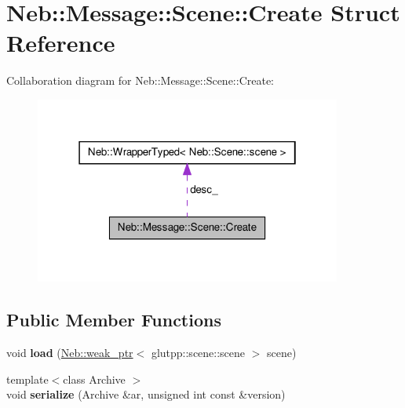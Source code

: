 \hypertarget{structNeb_1_1Message_1_1Scene_1_1Create}{\section{\-Neb\-:\-:\-Message\-:\-:\-Scene\-:\-:\-Create \-Struct \-Reference}
\label{structNeb_1_1Message_1_1Scene_1_1Create}
}


\-Collaboration diagram for \-Neb\-:\-:\-Message\-:\-:\-Scene\-:\-:\-Create\-:\nopagebreak
\begin{figure}[H]
\begin{center}
\leavevmode
\includegraphics[width=286pt]{structNeb_1_1Message_1_1Scene_1_1Create__coll__graph}
\end{center}
\end{figure}
\subsection*{\-Public \-Member \-Functions}
\begin{DoxyCompactItemize}
\item 
\hypertarget{structNeb_1_1Message_1_1Scene_1_1Create_a2550a95749cbd9ae2e8fcef05bf53025}{void {\bfseries load} (\hyperlink{classNeb_1_1weak__ptr}{\-Neb\-::weak\-\_\-ptr}$<$ glutpp\-::scene\-::scene $>$ scene)}\label{structNeb_1_1Message_1_1Scene_1_1Create_a2550a95749cbd9ae2e8fcef05bf53025}

\item 
\hypertarget{structNeb_1_1Message_1_1Scene_1_1Create_ab128d0e116d07b1034ef8f25adcfa4ac}{{\footnotesize template$<$class Archive $>$ }\\void {\bfseries serialize} (\-Archive \&ar, unsigned int const \&version)}\label{structNeb_1_1Message_1_1Scene_1_1Create_ab128d0e116d07b1034ef8f25adcfa4ac}

\end{DoxyCompactItemize}
